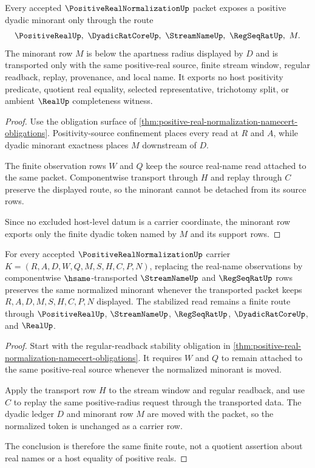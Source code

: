 \begin{theorem}
\label{thm:positive-real-normalization-dyadic-minorant}
Every accepted $\PositiveRealNormalizationUp$ packet exposes a positive dyadic minorant only through the route
$$
\PositiveRealUp,\ \DyadicRatCoreUp,\ \StreamNameUp,\ \RegSeqRatUp,\ M .
$$
The minorant row $M$ is below the apartness radius displayed by $D$ and is transported only with the same positive-real source, finite stream window, regular readback, replay, provenance, and local name. It exports no host positivity predicate, quotient real equality, selected representative, trichotomy split, or ambient $\RealUp$ completeness witness.
\end{theorem}
\begin{proof}
Use the obligation surface of \autoref{thm:positive-real-normalization-namecert-obligations}. Positivity-source confinement places every read at $R$ and $A$, while dyadic minorant exactness places $M$ downstream of $D$.

The finite observation rows $W$ and $Q$ keep the source real-name read attached to the same packet. Componentwise transport through $H$ and replay through $C$ preserve the displayed route, so the minorant cannot be detached from its source rows.

Since no excluded host-level datum is a carrier coordinate, the minorant row exports only the finite dyadic token named by $M$ and its support rows.
\end{proof}

\begin{theorem}
\label{thm:positive-real-normalization-regseqrat-stability}
For every accepted $\PositiveRealNormalizationUp$ carrier $K=(R,A,D,W,Q,M,S,H,C,P,N)$, replacing the real-name observations by componentwise $\hsame$-transported $\StreamNameUp$ and $\RegSeqRatUp$ rows preserves the same normalized minorant whenever the transported packet keeps $R,A,D,M,S,H,C,P,N$ displayed. The stabilized read remains a finite route through $\PositiveRealUp$, $\StreamNameUp$, $\RegSeqRatUp$, $\DyadicRatCoreUp$, and $\RealUp$.
\end{theorem}
\begin{proof}
Start with the regular-readback stability obligation in \autoref{thm:positive-real-normalization-namecert-obligations}. It requires $W$ and $Q$ to remain attached to the same positive-real source whenever the normalized minorant is moved.

Apply the transport row $H$ to the stream window and regular readback, and use $C$ to replay the same positive-radius request through the transported data. The dyadic ledger $D$ and minorant row $M$ are moved with the packet, so the normalized token is unchanged as a carrier row.

The conclusion is therefore the same finite route, not a quotient assertion about real names or a host equality of positive reals.
\end{proof}

